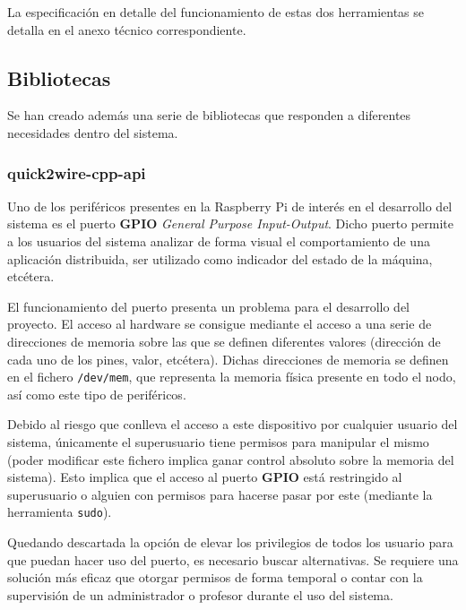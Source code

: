 La especificación en detalle del funcionamiento de estas dos herramientas se detalla en el anexo técnico correspondiente.

\subsection{Bibliotecas}

Se han creado además una serie de bibliotecas que responden a diferentes necesidades dentro del sistema.

\subsubsection{quick2wire-cpp-api}

Uno de los periféricos presentes en la Raspberry Pi de interés en el desarrollo del sistema es el puerto \textbf{GPIO} \textit{General Purpose Input-Output}. Dicho puerto permite a los usuarios del sistema analizar de forma visual el comportamiento de una aplicación distribuida, ser utilizado como indicador del estado de la máquina, etcétera.

El funcionamiento del puerto presenta un problema para el desarrollo del proyecto. El acceso al hardware se consigue mediante el acceso a una serie de direcciones de memoria sobre las que se definen diferentes valores (dirección de cada uno de los pines, valor, etcétera). Dichas direcciones de memoria se definen en el fichero \texttt{/dev/mem}, que representa la memoria física presente en todo el nodo, así como este tipo de periféricos.

Debido al riesgo que conlleva el acceso a este dispositivo por cualquier usuario del sistema, únicamente el superusuario tiene permisos para manipular el mismo (poder modificar este fichero implica ganar control absoluto sobre la memoria del sistema). Esto implica que el acceso al puerto \textbf{GPIO} está restringido al superusuario o alguien con permisos para hacerse pasar por este (mediante la herramienta \texttt{sudo}).

Quedando descartada la opción de elevar los privilegios de todos los usuario para que puedan hacer uso del puerto, es necesario buscar alternativas. Se requiere una solución más eficaz que otorgar permisos de forma temporal o contar con la supervisión de un administrador o profesor durante el uso del sistema.

